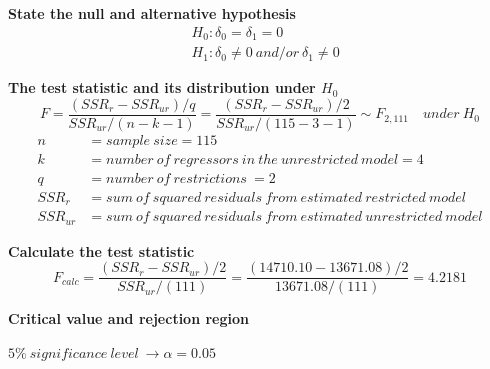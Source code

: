 \documentclass[12pt]{report}
\begin{document}
\justify
\noindent \textbf{State the null and alternative hypothesis}
\begin{align*}
	&H_0: \delta_0 = \delta_1 = 0 \\
	&H_1: \delta_0 \neq 0\ and/or\ \delta_1 \neq 0
\end{align*}

\noindent \textbf{The test statistic and its distribution under $H_0$}
$$F = \dfrac{(SSR_r - SSR_{ur})/q}{SSR_{ur}/(n-k-1)} = \dfrac{(SSR_r - SSR_{ur})/2}{SSR_{ur}/(115-3-1)} \sim F_{2,111} \quad under\ H_0$$
\begin{align*}
n &= sample\ size = 115 \\
k &= number\ of\ regressors\ in\ the\ unrestricted\ model = 4 \\
q &= number\ of\ restrictions\ = 2 \\
SSR_{r} &= sum\ of\ squared\ residuals\ from\ estimated\ restricted\ model \\
SSR_{ur} &= sum\ of\ squared\ residuals\ from\ estimated\ unrestricted\ model
\end{align*}

\noindent \textbf{Calculate the test statistic}
$$F_{calc} = \dfrac{(SSR_r - SSR_{ur})/2}{SSR_{ur}/(111)} = \dfrac{(14710.10-13671.08)/2}{13671.08/(111)} = 4.2181 $$


\noindent \textbf{Critical value and rejection region}

\noindent $5\%\ significance\ level\ \to \alpha = 0.05$
\end{document}
